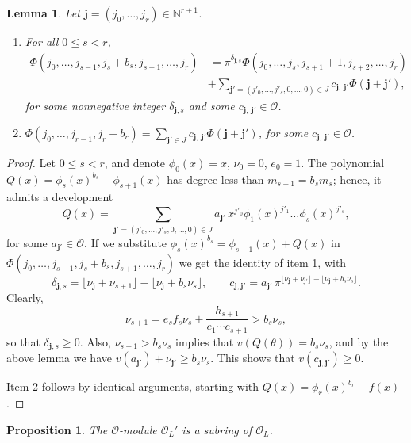 \documentclass{amsart}
\newtheorem{lemma}[theorem]{Lemma}
\newtheorem{proposition}[theorem]{Proposition}
\newcommand{\N}{\mathbb N}
\def\j{\mathbf{j}}
\def\ol{{\mathcal O}_L}
\def\oo{{\mathcal O}}
\def\t{\theta}
\begin{document}
\begin{lemma}
Let $\j=(j_0,\dots,j_r)\in\N^{r+1}$.
\begin{enumerate}
 \item For all $0\le s<r$,
\begin{align*}
\Phi(j_0,\dots,j_{s-1},j_s+b_s,j_{s+1},\dots,j_r)&\,=\pi^{\delta_{\j,s}}
\Phi(j_0,\dots,j_s,j_{s+1}+1,j_{s+2},\dots,j_r)\\&+\sum_{\j'=(j'_0,\dots,j'_s,0,\dots,0)\in J}
c_{\j,\,\j'}\Phi(\j+\j'),
\end{align*}
for some nonnegative integer $\delta_{\j,s}$ and some $c_{\j,\,\j'}\in\oo$.
\item $\Phi(j_0,\dots,j_{r-1},j_r+b_r)=\sum_{\j'\in J}
c_{\j,\,\j'}\Phi(\j+\j')$, for some $c_{\j,\,\j'}\in\oo$.
\end{enumerate}
\end{lemma}

\begin{proof}
Let $0\le s<r$, and denote $\phi_0(x)=x$, $\nu_0=0$, $e_0=1$. The polynomial $Q(x)=\phi_s(x)^{b_s}-\phi_{s+1}(x)$ has degree less than $m_{s+1}=b_sm_s$; hence, it admits a development $$Q(x)=\sum_{\j'=(j'_0,\dots,j'_s,0,\dots,0)\in J}a_{\j'}\, x^{j'_0}\phi_1(x)^{j'_1}\dots\phi_s(x)^{j'_s},$$ for some $a_{\j'}\in\oo$. 
If we substitute $\phi_s(x)^{b_s}=\phi_{s+1}(x)+Q(x)$ in $\Phi(j_0,\dots,j_{s-1},j_s+b_s,j_{s+1},\dots,j_r)$ we get the identity of item 1,
with $$\delta_{\j,s}=\lfloor \nu_\j+\nu_{s+1}\rfloor-\lfloor \nu_\j+b_s\nu_s\rfloor, \qquad 
c_{\j,\j'}=a_{\j'}\,\pi^{\lfloor \nu_\j+\nu_{\j'}\rfloor-\lfloor \nu_\j+b_s\nu_s\rfloor}.$$
Clearly, 
$$\nu_{s+1}=e_sf_s\nu_s+\dfrac{h_{s+1}}{e_1\cdots e_{s+1}}>b_s\nu_s,$$so that $\delta_{\j,s}\ge 0$. Also, $\nu_{s+1}>b_s\nu_s$ implies that $v(Q(\t))=b_s\nu_s$, and by the above lemma we have 
$v(a_{\j'})+\nu_{\j'}\ge b_s\nu_s$. This shows that $v(c_{\j,\j'})\ge 0$.

Item 2 follows by identical arguments, starting with $Q(x)=\phi_r(x)^{b_r}-f(x)$.
\end{proof}

\begin{proposition}\label{subring}
The $\oo$-module $\ol'$ is a subring of $\ol$. 
\end{proposition}
\end{document}
